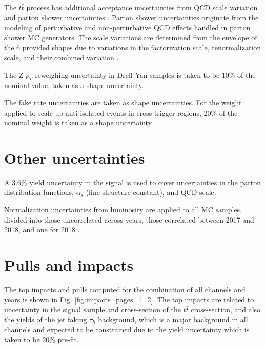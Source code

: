 The $t\bar{t}$ process has additional acceptance uncertainties from QCD scale variation and parton shower uncertainties \cite{twiki_Top_systematics}.  Parton shower uncertainties originate from the modeling of perturbative and non-perturbative QCD effects handled in parton shower MC generators. The scale variations are determined from the envelope of the 6 provided shapes due to variations in the factorization scale, renormalization scale, and their combined variation \cite{twiki_Top_systematics}.

The Z $p_{T}$ reweighing uncertainty in Drell-Yan samples is taken to be 10\% of the nominal value, taken as a shape uncertainty. 

The fake rate uncertainties are taken as shape uncertainties. For the weight applied to scale up anti-isolated events in cross-trigger regions, 20\% of the nominal weight is taken as a shape uncertainty.

\section{Other uncertainties}
A 3.6\% yield uncertainty in the signal is used to cover uncertainties in the parton distribution functions, $\alpha_s$ (fine structure constant), and QCD scale. 

Normalization uncertainties from luminosity are applied to all MC samples, divided into those uncorrelated across years, those correlated between 2017 and 2018, and one for 2018 \cite{twiki_LUMI_POG_recommendation}.

\section{Pulls and impacts}
The top impacts and pulls computed for the combination of all channels and years is shown in Fig. \ref{fig:impacts_pages_1_2}. The top impacts are related to uncertainty in the signal sample and cross-section of the $t\bar{t}$ cross-section, and also the yields of the jet faking $\tau_{h}$ background, which is a major background in all channels and expected to be constrained due to the yield uncertainty which is taken to be 20\% pre-fit. 

